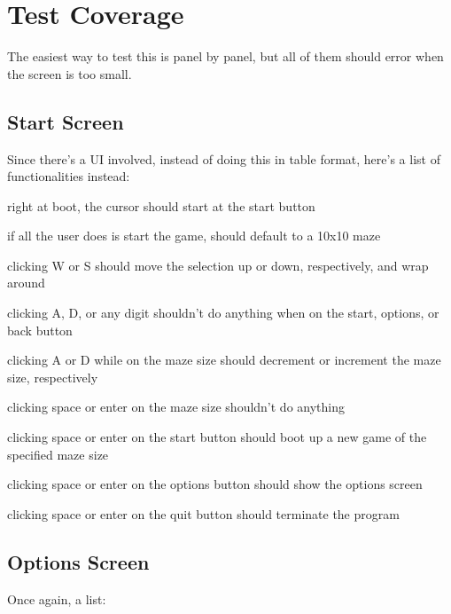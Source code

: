 \documentclass[11pt]{article} %
\begin{document}
\section{Test Coverage}

The easiest way to test this is panel by panel, but all of them should error when the screen is too small. 

\subsection{Start Screen}
Since there's a UI involved, instead of doing this in table format, here's a list of functionalities instead:

\begin{compactitem}
	\item right at boot, the cursor should start at the start button
	\item if all the user does is start the game, should default to a 10x10 maze
	\item clicking W or S should move the selection up or down, respectively, and wrap around 
	\item clicking A, D, or any digit shouldn't do anything when on the start, options, or back button
	\item clicking A or D while on the maze size should decrement or increment the maze size, respectively
	\item clicking space or enter on the maze size shouldn't do anything
	\item clicking space or enter on the start button should boot up a new game of the specified maze size 
	\item clicking space or enter on the options button should show the options screen 
	\item clicking space or enter on the quit button should terminate the program
\end{compactitem} 

\subsection{Options Screen}
Once again, a list: 
\end{document}
